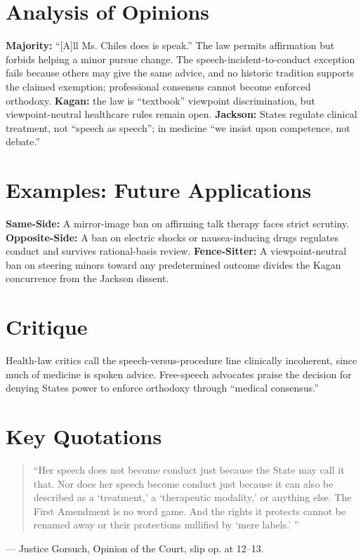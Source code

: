 \documentclass[12pt]{article}
\begin{document}
\section{Analysis of Opinions}
\textbf{Majority:} ``[A]ll Ms. Chiles does is speak.'' The law permits affirmation but forbids helping a minor pursue change. The speech-incident-to-conduct exception fails because others may give the same advice, and no historic tradition supports the claimed exemption; professional consensus cannot become enforced orthodoxy. \textbf{Kagan:} the law is ``textbook'' viewpoint discrimination, but viewpoint-neutral healthcare rules remain open. \textbf{Jackson:} States regulate clinical treatment, not ``speech as speech''; in medicine ``we insist upon competence, not debate.''

\section{Examples: Future Applications}
\textbf{Same-Side:} A mirror-image ban on affirming talk therapy faces strict scrutiny. \textbf{Opposite-Side:} A ban on electric shocks or nausea-inducing drugs regulates conduct and survives rational-basis review. \textbf{Fence-Sitter:} A viewpoint-neutral ban on steering minors toward any predetermined outcome divides the Kagan concurrence from the Jackson dissent.

\section{Critique}
Health-law critics call the speech-versus-procedure line clinically incoherent, since much of medicine is spoken advice. Free-speech advocates praise the decision for denying States power to enforce orthodoxy through ``medical consensus.''

\section{Key Quotations}
\begin{quote}
``Her speech does not become conduct just because the State may call it that. Nor does her speech become conduct just because it can also be described as a `treatment,' a `therapeutic modality,' or anything else. The First Amendment is no word game. And the rights it protects cannot be renamed away or their protections nullified by `mere labels.' ''
\end{quote}
\noindent --- Justice Gorsuch, Opinion of the Court, slip op. at 12--13.
\end{document}
